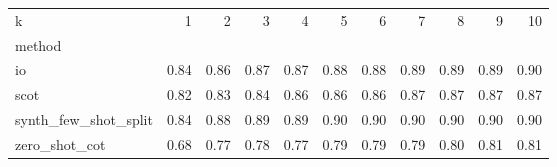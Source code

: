 \begin{tabular}{lrrrrrrrrrr}
\toprule
k & 1 & 2 & 3 & 4 & 5 & 6 & 7 & 8 & 9 & 10 \\
method &  &  &  &  &  &  &  &  &  &  \\
\midrule
io & 0.84 & 0.86 & 0.87 & 0.87 & 0.88 & 0.88 & 0.89 & 0.89 & 0.89 & 0.90 \\
scot & 0.82 & 0.83 & 0.84 & 0.86 & 0.86 & 0.86 & 0.87 & 0.87 & 0.87 & 0.87 \\
synth_few_shot_split & 0.84 & 0.88 & 0.89 & 0.89 & 0.90 & 0.90 & 0.90 & 0.90 & 0.90 & 0.90 \\
zero_shot_cot & 0.68 & 0.77 & 0.78 & 0.77 & 0.79 & 0.79 & 0.79 & 0.80 & 0.81 & 0.81 \\
\bottomrule
\end{tabular}
